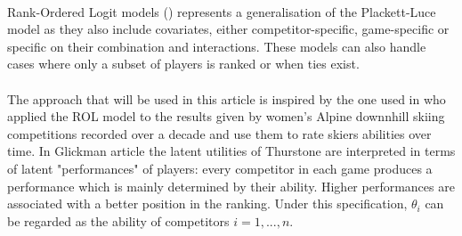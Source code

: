\\
Rank-Ordered Logit models (\cite{hausman1987specifying}) represents a generalisation of the Plackett-Luce model  as they also include covariates, either competitor-specific, game-specific or specific on their combination and interactions. These models can also  handle cases where only a subset of players is ranked or when ties exist.\\
\\
The approach that will be used in this article is inspired by the one used in \cite{glickman2015stochastic} who applied the ROL model to the results given by women's Alpine downnhill skiing competitions recorded over a decade and use them to rate skiers abilities over time. In Glickman article the latent utilities of Thurstone are interpreted in terms of latent "performances" of players: every competitor in each game produces a performance which is mainly determined  by their ability. Higher performances are associated with a better position in the ranking. Under this specification,  $\theta_{i}$ can be regarded as  the ability of competitors $i=1,...,n$.\\

